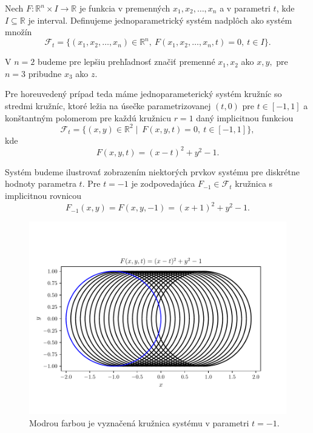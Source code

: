 \begin{definition}
Nech $F \colon \mathbb{R}^{n} \times I \rightarrow \mathbb{R}$ je funkcia v premenných $ x_{1}, x_{2}, \ldots, x_{n} $ a v parametri $t$, kde $I \subseteq \mathbb{R}$ je interval. Definujeme jednoparametrický systém nadplôch ako systém množín 
$$
\mathcal{F}_{t} = \{ (x_{1}, x_{2}, \ldots, x_{n}) \in \mathbb{R}^{n}, \ F(x_{1}, x_{2}, \ldots, x_{n}, t) = 0, \ t \in I \}.
$$
\end{definition}

V $n = 2$ budeme pre lepšiu prehľadnosť značiť premenné $x_{1}, x_{2}$ ako $x, y,$ pre $n = 3$ pribudne $x_{3}$ ako $z.$

Pre horeuvedený prípad teda máme jednoparameterický systém kružníc so stredmi kružníc, ktoré ležia na úsečke parametrizovanej $(t,0)$ pre $t \in [-1,1]$ a konštantným polomerom pre každú kružnicu $r = 1$ daný implicitnou funkciou
$$ \mathcal{F}_{t} = \{ (x, y) \in \mathbb{R}^{2} \mid \ F(x, y, t) = 0, \ t \in [-1,1] \}, $$
kde
$$ F(x, y, t) = (x - t)^2 + y^2 - 1.$$

Systém budeme ilustrovať zobrazením niektorých prvkov systému pre diskrétne hodnoty parametra $t$. Pre $t = -1$ je zodpovedajúca $F_{-1} \in \mathcal{F}_{t}$  kružnica s implicitnou rovnicou
$$ F_{-1}(x, y) = F(x, y, -1) = (x + 1)^2 + y^2 - 1. $$

\begin{figure}[H]
	\centering
	\includegraphics{images/one_element_of_system.pdf}
	\caption[Zobrazenie prvkov systému.]{Modrou farbou je vyznačená kružnica systému v parametri $t=-1$.}
	\label{fig:one_element_of_system}
\end{figure}


